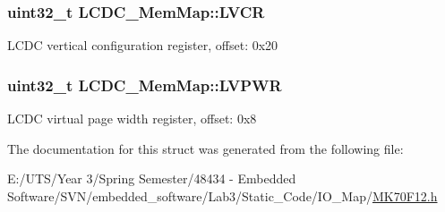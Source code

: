 \subsubsection[{L\+V\+C\+R}]{\setlength{\rightskip}{0pt plus 5cm}uint32\+\_\+t L\+C\+D\+C\+\_\+\+Mem\+Map\+::\+L\+V\+C\+R}\label{struct_l_c_d_c___mem_map_a865c74a990435ca94ba226f23894d8e7}
L\+C\+D\+C vertical configuration register, offset\+: 0x20 \hypertarget{struct_l_c_d_c___mem_map_aa687c8b47cdcef18890cac689de49a17}{}
\subsubsection[{L\+V\+P\+W\+R}]{\setlength{\rightskip}{0pt plus 5cm}uint32\+\_\+t L\+C\+D\+C\+\_\+\+Mem\+Map\+::\+L\+V\+P\+W\+R}\label{struct_l_c_d_c___mem_map_aa687c8b47cdcef18890cac689de49a17}
L\+C\+D\+C virtual page width register, offset\+: 0x8 

The documentation for this struct was generated from the following file\+:\begin{DoxyCompactItemize}
\item 
E\+:/\+U\+T\+S/\+Year 3/\+Spring Semester/48434 -\/ Embedded Software/\+S\+V\+N/embedded\+\_\+software/\+Lab3/\+Static\+\_\+\+Code/\+I\+O\+\_\+\+Map/\hyperlink{_m_k70_f12_8h}{M\+K70\+F12.\+h}\end{DoxyCompactItemize}
